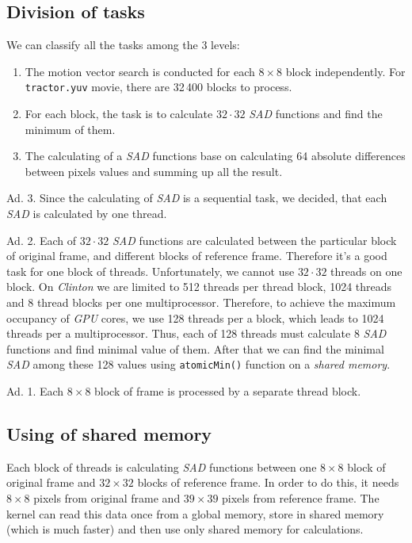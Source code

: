\documentclass[11pt]{article}
\begin{document}
\subsection{Division of tasks}
We can classify all the tasks among the 3 levels:
\begin{enumerate}
  \item The motion vector search is conducted for each $8 \times 8$ block 
  independently.
  For \texttt{tractor.yuv} movie, there are 32\,400 blocks to process.
  \item For each block, the task is to calculate $32 \cdot 32$ \emph{SAD} 
  functions and find the minimum of them.
  \item The calculating of a \emph{SAD} functions base on calculating 
  64 absolute differences between pixels values and summing up all the result.
\end{enumerate}

Ad. 3. Since the calculating of \emph{SAD} is a sequential task, we decided, that each \emph{SAD} is calculated by one thread.

Ad. 2. Each of $32 \cdot 32$ \emph{SAD} functions are calculated between the
particular block of original frame, and different blocks of reference frame.
Therefore it's a good task for one block of threads.
Unfortunately, we cannot use $32 \cdot 32$ threads on one block.
On \emph{Clinton} we are limited to 512 threads per thread block, 1024 threads and 8 thread blocks per one multiprocessor.
Therefore, to achieve the maximum occupancy of \emph{GPU} cores, we use 128
threads per a block, which leads to 1024 threads per a multiprocessor.
Thus, each of 128 threads must calculate 8 \emph{SAD} functions and find 
minimal value of them.
After that we can find the minimal \emph{SAD} among these 128 values using
\texttt{atomicMin()} function on a \emph{shared memory}.

Ad. 1. Each $8 \times 8$ block of frame is processed by a separate thread
block.

\subsection{Using of shared memory}
Each block of threads is calculating \emph{SAD} functions between one 
$8 \times 8$ block of original frame and $32 \times 32$ blocks of reference
frame. In order to do this, it needs $8 \times 8$ pixels from original
frame and $39 \times 39$ pixels from reference frame.
The kernel can read this data once from a global memory, store in shared
memory (which is much faster) and then use only shared memory for calculations.
\end{document}
